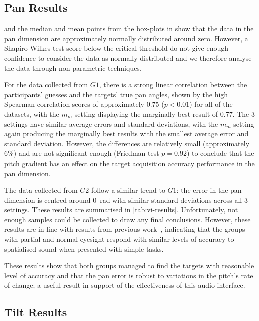 \documentclass[sigconf, screen=true, anonymous=true]{acmart}
\begin{document}
\subsection{Pan Results}

 and the median and mean points from the box-plots in  show that the data in the pan dimension are approximately normally distributed around zero.
However, a Shapiro-Wilkes test score below the critical threshold do not give enough confidence to consider the data as normally distributed and we therefore analyse the data through non-parametric techniques. 

For the data collected from $G1$, there is a strong linear correlation between the participants' guesses and the targets' true pan angles, shown by the high Spearman correlation scores of approximately 0.75 ($p < 0.01$) for all of the datasets, with the $m_m$ setting displaying the marginally best result of 0.77.
The 3 settings have similar average errors and standard deviations, with the $m_m$ setting again producing the marginally best results with the smallest average error and standard deviation.
However, the differences are relatively small (approximately 6\%) and are not significant enough (Friedman test $p = 0.92$) to conclude that the pitch gradient has an effect on the target acquisition accuracy performance in the pan dimension. 

The data collected from $G2$ follow a similar trend to $G1$: the error in the pan dimension is centred around \SI{0}{\radian} with similar standard deviations across all 3 settings.
These results are summarised in \cref{tab:vi-results}.
Unfortunately, not enough samples could be collected to draw any final conclusions.
However, these results are in line with results from previous work~\cite{zwiers2001spatial}, indicating that the groups with partial and normal eyesight respond with similar levels of accuracy to spatialised sound when presented with simple tasks. 

These results show that both groups managed to find the targets with reasonable level of accuracy and that the pan error is robust to variations in the pitch's rate of change; a useful result in support of the effectiveness of this audio interface.

\subsection{Tilt Results}\label{sec:tilt-results}
\end{document}
